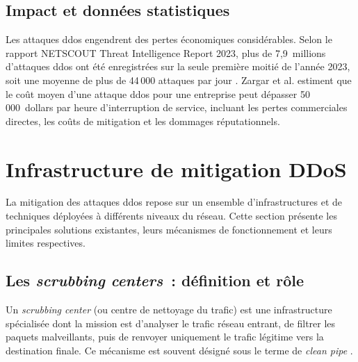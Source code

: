 \subsection{Impact et données statistiques}

Les attaques \gls{ddos} engendrent des pertes économiques considérables. Selon le rapport NETSCOUT Threat Intelligence Report 2023, plus de 7,9~millions d'attaques \gls{ddos} ont été enregistrées sur la seule première moitié de l'année 2023, soit une moyenne de plus de 44\,000 attaques par jour \parencite{netscout2023}. Zargar et al. \parencite{zargar2013survey} estiment que le coût moyen d'une attaque \gls{ddos} pour une entreprise peut dépasser 50\,000~dollars par heure d'interruption de service, incluant les pertes commerciales directes, les coûts de mitigation et les dommages réputationnels.

\section{Infrastructure de mitigation DDoS}
\label{sec:mitigation}

La mitigation des attaques \gls{ddos} repose sur un ensemble d'infrastructures et de techniques déployées à différents niveaux du réseau. Cette section présente les principales solutions existantes, leurs mécanismes de fonctionnement et leurs limites respectives.

\subsection{Les \textit{scrubbing centers}~: définition et rôle}

Un \textit{scrubbing center} (ou centre de nettoyage du trafic) est une infrastructure spécialisée dont la mission est d'analyser le trafic réseau entrant, de filtrer les paquets malveillants, puis de renvoyer uniquement le trafic légitime vers la destination finale. Ce mécanisme est souvent désigné sous le terme de \og \textit{clean pipe} \fg{} \parencite{mahajan2002controlling}.

